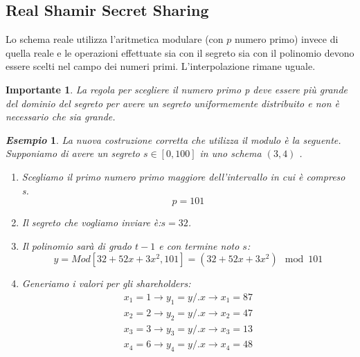 \documentclass{book}
\newtheorem*{Importante}{\textbf{Importante}}
\newtheorem{esempio}{\emph{Esempio}}
\begin{document}
\subsection{Real Shamir Secret Sharing}
Lo schema reale utilizza l'aritmetica modulare (con \(p\) numero primo) invece di quella reale e  le operazioni effettuate sia con il segreto sia con il polinomio devono essere scelti nel campo dei numeri primi\@.\newline
L'interpolazione rimane uguale\@.
\begin{Importante}
    La regola per scegliere il numero primo p deve essere più grande del dominio del segreto per avere un segreto uniformemente distribuito e non è necessario che sia grande\@.
\end{Importante}
\begin{esempio}
    La nuova costruzione corretta che utilizza il modulo è la seguente\@.\newline
    Supponiamo di avere un segreto \(s\in[0,100]\) in uno schema \((3,4) \) \@.
    \begin{enumerate}
        \item Scegliamo il primo numero primo maggiore dell'intervallo in cui è compreso s\@.
              \begin{equation*}
                  p=101
              \end{equation*}
        \item Il segreto che vogliamo inviare è:\@ \(s=32\).
        \item Il polinomio sarà di grado \(t-1\) e con termine noto \(s\):\begin{equation*}
                  y=Mod[32+52x+3x^{2},101]=(32+52x+3x^{2})\mod{101}
              \end{equation*}
        \item Generiamo i valori per gli shareholders:
              \begin{equation*}
                  \begin{matrix}
                      x_{1}=1\rightarrow y_{1}=y/.{x\rightarrow x_{1}}=87 \\
                      x_{2}=2\rightarrow y_{2}=y/.{x\rightarrow x_{2}}=47 \\
                      x_{3}=3\rightarrow y_{3}=y/.{x\rightarrow x_{3}}=13 \\
                      x_{4}=6\rightarrow y_{4}=y/.{x\rightarrow x_{4}}=48 \\
                  \end{matrix}
              \end{equation*}

\end{enumerate}
\end{esempio}
\end{document}
